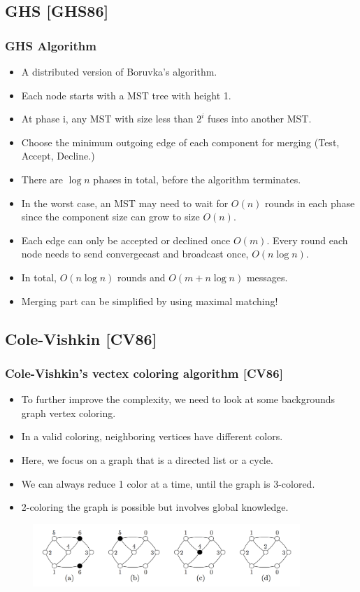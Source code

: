 \subsection{GHS [GHS86]}
\begin{frame}
\frametitle{GHS Algorithm}
\begin{itemize}
    \item A distributed version of Boruvka's algorithm.
    \item Each node starts with a MST tree with height 1.
    \item At phase i, any MST with size less than $2^i$ fuses into another MST.
    \item Choose the minimum outgoing edge of each component for merging (Test, Accept, Decline.)
    \item There are $\log n$ phases in total, before the algorithm terminates.
    \item In the worst case, an MST may need to wait for $O(n)$ rounds in each phase since the component size can grow to size $O(n)$. 
    \item Each edge can only be accepted or declined once $O(m)$. Every round each node needs to send convergecast and broadcast once, $O(n \log n)$.
    \item In total, $O(n \log n)$ rounds and $O(m + n \log n)$ messages.
    \item Merging part can be simplified by using maximal matching!
\end{itemize}
\end{frame}

\subsection{Cole-Vishkin [CV86]}
\begin{frame}
\frametitle{Cole-Vishkin's vectex coloring algorithm [CV86]}
\begin{itemize}
    \item To further improve the complexity, we need to look at some backgrounds graph vertex coloring.
    \item In a valid coloring, neighboring vertices have different colors.
    \item Here, we focus on a graph that is a directed list or a cycle.
    \item We can always reduce 1 color at a time, until the graph is 3-colored.
    \item 2-coloring the graph is possible but involves global knowledge.
\end{itemize}
\begin{figure}
    \includegraphics[width=0.9\textwidth]{figures/reduce_one.png}
\end{figure}
\end{frame}

